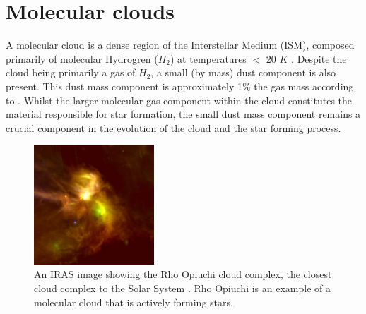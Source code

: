 \documentclass{report}
\begin{document}
\section{Molecular clouds}
A molecular cloud is a dense region of the Interstellar Medium (ISM), composed primarily of molecular Hydrogren ($H_{2}$) at temperatures $<$ 20 $K$ \parencite{dustopacity}. Despite the cloud being primarily a gas of $H_{2}$, a small (by mass) dust component is also present. This dust mass component is approximately 1\% the gas mass according to \textcite{noise}. Whilst the larger molecular gas component within the cloud constitutes the material responsible for star formation, the small dust mass component remains a crucial component in the evolution of the cloud and the star forming process.

\begin{figure}
  \begin{center}
    \includegraphics[width=0.4\textwidth]{../img/rho.jpg}
    \caption[An IRAS image showing the Rho Opiuchi cloud complex, the closest cloud complex to the Solar System \parencite{rho}. Rho Opiuchi is an example of a molecular cloud that is actively forming stars.]{An IRAS image showing the Rho Opiuchi cloud complex, the closest cloud complex to the Solar System \parencite{rho}. Rho Opiuchi is an example of a molecular cloud that is actively forming stars.}
  \end{center}
\end{figure} \label{fig:rho}
\end{document}

